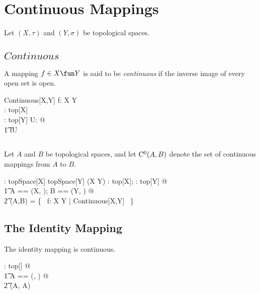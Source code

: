 \documentclass{amsart}
\begin{document}
\section{Continuous Mappings}

Let $(X,\tau)$ and $(Y,\sigma)$ be topological spaces.

\subsection{$Continuous$}

A mapping $f \in X \fun Y$ is said to be {\it continuous} if the inverse image of every open set is open.

\begin{schema}{Continuous}[X,Y]
	f: X \fun Y \\
	\tau: top[X] \\
	\sigma: top[Y]
\where
	\forall U: \sigma @ \\
	\t1	f\inv\limg U \rimg \in \tau
\end{schema}

\subsection{}

Let $A$ and $B$ be topological spaces, and
let $\operatorname{C^0}(A,B)$ denote the set of continuous mappings from $A$ to $B$.

\begin{gendef}[X,Y]
	\CzeroTT: topSpace[X] \cross topSpace[Y] \fun \power (X \fun Y)
\where
	\forall \tau: top[X]; \sigma: top[Y] @ \\
	\t1	\LET A == (X, \tau); B == (Y, \sigma) @ \\
	\t2		\CzeroTT(A,B) = \{~ f: X \fun Y | Continuous[X,Y] ~\}
\end{gendef}

\subsection{The Identity Mapping}

\begin{remark}
The identity mapping is continuous.

\begin{zed}
	\forall \tau: top[\setX] @ \\
	\t1	\LET A == (\setX, \tau) @ \\
	\t2		\id \setX \in \CzeroTT(A, A)
\end{zed}

\end{remark}
\end{document}
